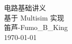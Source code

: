 \documentclass{article}
\numberwithin{figure}{subsection} %
\begin{document}
\begin{titlepage}
    \centering
    {\Huge 电路基础讲义 \\[1cm]}
    {\Large 基于 Multisim 实现 \\[2cm]}
    {\Large 笛芦-Fumo\_B\_King \\[1cm]}
    {\large \today}
\end{titlepage}


\tableofcontents        %
\setcounter{page}{1}
\newpage                %

\setcounter{page}{1}


\end{document}
